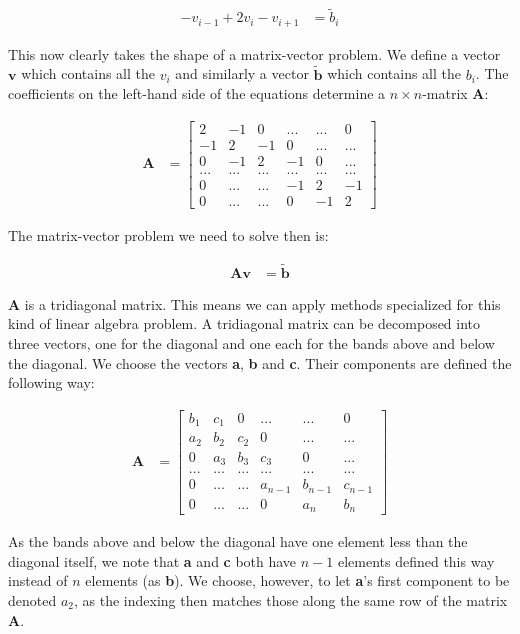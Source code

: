 \documentclass[english,notitlepage,reprint,nofootinbib]{revtex4-1}  %
\begin{document}
\begin{align*}
-v_{i-1} + 2v_i - v_{i+1} &= \tilde{b}_i
\end{align*}

This now clearly takes the shape of a matrix-vector problem. We define a vector $\textbf{v}$ which contains all the $v_i$ and similarly a vector $\tilde{\textbf{b}}$ which contains all the $b_i$. The coefficients on the left-hand side of the equations determine a $n\times n$-matrix \textbf{A}:

\begin{align*}
\textbf{A} &= \begin{bmatrix}
2 & -1 & 0 & ... & ... & 0 \\
-1 & 2 & -1 & 0 & ... & ... \\
0 & -1 & 2 & -1 & 0 & ... \\
... & ... & ... & ... & ... & ... \\
0 & ... & ... & -1 & 2 & -1 \\
0 & ... & ... & 0 & -1 & 2
\end{bmatrix}
\end{align*}

The matrix-vector problem we need to solve then is:

\begin{align*}
\textbf{A}\textbf{v} &= \tilde{\textbf{b}}
\end{align*}

\textbf{A} is a tridiagonal matrix. This means we can apply methods specialized for this kind of linear algebra problem. A tridiagonal matrix can be decomposed into three vectors, one for the diagonal and one each for the bands above and below the diagonal. We choose the vectors \textbf{a}, \textbf{b} and \textbf{c}. Their components are defined the following way:

\begin{align*}
\textbf{A} &= \begin{bmatrix}
b_1 & c_1 & 0 & ... & ... & 0 \\
a_2 & b_2 & c_2 & 0 & ... & ... \\
0 & a_3 & b_3 & c_3 & 0 & ... \\
... & ... & ... & ... & ... & ... \\
0 & ... & ... & a_{n-1} & b_{n-1} & c_{n-1} \\
0 & ... & ... & 0 & a_{n} & b_n
\end{bmatrix}
\end{align*}

As the bands above and below the diagonal have one element less than the diagonal itself, we note that \textbf{a} and \textbf{c} both have $n-1$ elements defined this way instead of $n$ elements (as \textbf{b}). We choose, however, to let \textbf{a}'s first component to be denoted $a_2$, as the indexing then matches those along the same row of the matrix \textbf{A}.
\end{document}
